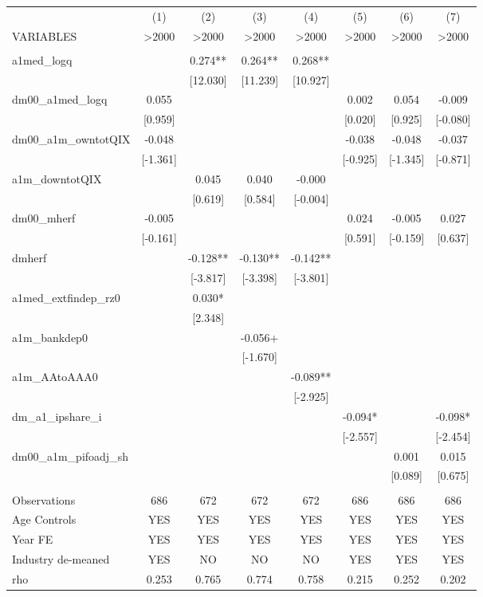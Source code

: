 \documentclass[]{article}
\begin{document}
\begin{tabular}{lccccccc} \hline
 & (1) & (2) & (3) & (4) & (5) & (6) & (7) \\
VARIABLES & >2000 & >2000 & >2000 & >2000 & >2000 & >2000 & >2000 \\ \hline
 &  &  &  &  &  &  &  \\
a1med\_logq &  & 0.274** & 0.264** & 0.268** &  &  &  \\
 &  & [12.030] & [11.239] & [10.927] &  &  &  \\
dm00\_a1med\_logq & 0.055 &  &  &  & 0.002 & 0.054 & -0.009 \\
 & [0.959] &  &  &  & [0.020] & [0.925] & [-0.080] \\
dm00\_a1m\_owntotQIX & -0.048 &  &  &  & -0.038 & -0.048 & -0.037 \\
 & [-1.361] &  &  &  & [-0.925] & [-1.345] & [-0.871] \\
a1m\_downtotQIX &  & 0.045 & 0.040 & -0.000 &  &  &  \\
 &  & [0.619] & [0.584] & [-0.004] &  &  &  \\
dm00\_mherf & -0.005 &  &  &  & 0.024 & -0.005 & 0.027 \\
 & [-0.161] &  &  &  & [0.591] & [-0.159] & [0.637] \\
dmherf &  & -0.128** & -0.130** & -0.142** &  &  &  \\
 &  & [-3.817] & [-3.398] & [-3.801] &  &  &  \\
a1med\_extfindep\_rz0 &  & 0.030* &  &  &  &  &  \\
 &  & [2.348] &  &  &  &  &  \\
a1m\_bankdep0 &  &  & -0.056+ &  &  &  &  \\
 &  &  & [-1.670] &  &  &  &  \\
a1m\_AAtoAAA0 &  &  &  & -0.089** &  &  &  \\
 &  &  &  & [-2.925] &  &  &  \\
dm\_a1\_ipshare\_i &  &  &  &  & -0.094* &  & -0.098* \\
 &  &  &  &  & [-2.557] &  & [-2.454] \\
dm00\_a1m\_pifoadj\_sh &  &  &  &  &  & 0.001 & 0.015 \\
 &  &  &  &  &  & [0.089] & [0.675] \\
 &  &  &  &  &  &  &  \\
Observations & 686 & 672 & 672 & 672 & 686 & 686 & 686 \\
Age Controls & YES & YES & YES & YES & YES & YES & YES \\
Year FE & YES & YES & YES & YES & YES & YES & YES \\
Industry de-meaned & YES & NO & NO & NO & YES & YES & YES \\
 rho & 0.253 & 0.765 & 0.774 & 0.758 & 0.215 & 0.252 & 0.202 \\ \hline
\end{tabular}
\end{document}
